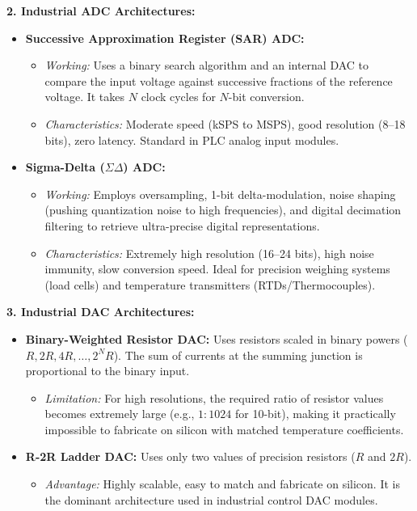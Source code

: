 \documentclass[12pt,a4paper]{article}
\begin{document}
\textbf{2. Industrial ADC Architectures:}
\begin{itemize}[leftmargin=*, itemsep=2.5pt]
  \item \textbf{Successive Approximation Register (SAR) ADC:}
    \begin{itemize}[leftmargin=*, itemsep=1.5pt]
      \item \textit{Working:} Uses a binary search algorithm and an internal DAC to compare the input voltage against successive fractions of the reference voltage. It takes $N$ clock cycles for $N$-bit conversion.
      \item \textit{Characteristics:} Moderate speed (kSPS to MSPS), good resolution (8--18 bits), zero latency. Standard in PLC analog input modules.
    \end{itemize}
  \item \textbf{Sigma-Delta ($\Sigma\Delta$) ADC:}
    \begin{itemize}[leftmargin=*, itemsep=1.5pt]
      \item \textit{Working:} Employs oversampling, 1-bit delta-modulation, noise shaping (pushing quantization noise to high frequencies), and digital decimation filtering to retrieve ultra-precise digital representations.
      \item \textit{Characteristics:} Extremely high resolution (16--24 bits), high noise immunity, slow conversion speed. Ideal for precision weighing systems (load cells) and temperature transmitters (RTDs/Thermocouples).
    \end{itemize}
\end{itemize}

\textbf{3. Industrial DAC Architectures:}
\begin{itemize}[leftmargin=*, itemsep=2.5pt]
  \item \textbf{Binary-Weighted Resistor DAC:} Uses resistors scaled in binary powers ($R, 2R, 4R, \dots, 2^N R$). The sum of currents at the summing junction is proportional to the binary input.
    \begin{itemize}[leftmargin=*, itemsep=1.5pt]
      \item \textit{Limitation:} For high resolutions, the required ratio of resistor values becomes extremely large (e.g., $1:1024$ for 10-bit), making it practically impossible to fabricate on silicon with matched temperature coefficients.
    \end{itemize}
  \item \textbf{R-2R Ladder DAC:} Uses only two values of precision resistors ($R$ and $2R$).
    \begin{itemize}[leftmargin=*, itemsep=1.5pt]
      \item \textit{Advantage:} Highly scalable, easy to match and fabricate on silicon. It is the dominant architecture used in industrial control DAC modules.
    \end{itemize}
\end{itemize}
\end{document}
